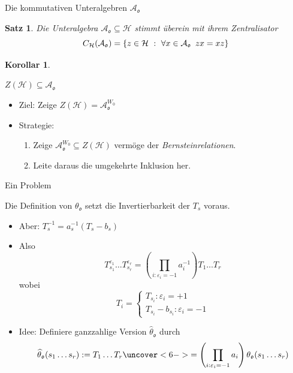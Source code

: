 \documentclass[pdf]{beamer}
\newtheorem*{satz*}{Satz}
\newtheorem*{cor*}{Korollar}
\begin{document}
\begin{frame}{Die kommutativen Unteralgebren $\mathcal{A}_{\mathfrak{o}}$}
   \begin{satz*}
      Die Unteralgebra $\mathcal{A}_{\mathfrak{o}} \subseteq \mathcal{H}$ stimmt überein mit ihrem Zentralisator
      \[ C_{\mathcal{H}}(\mathcal{A}_{\mathfrak{o}}) = \{ z \in \mathcal{H}\ :\ \forall x \in \mathcal{A}_{\mathfrak{o}}\enskip zx = xz\} \]
   \end{satz*}
   \pause \begin{cor*}
      \begin{center}$Z(\mathcal{H}) \subseteq \mathcal{A}_{\mathfrak{o}}$\end{center}
   \end{cor*}
   \pause\begin{itemize}
      \item Ziel: Zeige $Z(\mathcal{H}) = \mathcal{A}_{\mathfrak{o}}^{W_0}$
      \item<4-> Strategie:
         \begin{enumerate}
            \item<5-> Zeige $\mathcal{A}_{\mathfrak{o}}^{W_0} \subseteq Z(\mathcal{H})$ vermöge der \textit{Bernsteinrelationen}.
            \item<6-> Leite daraus die umgekehrte Inklusion her.
         \end{enumerate}
   \end{itemize}
\end{frame}

\begin{frame}{Ein Problem}
   \begin{problem}Die Definition von $\theta_\mathfrak{o}$ setzt die Invertierbarkeit der $T_s$ voraus.
   \end{problem}
   \begin{itemize}
      \item<2-> Aber: $T_s^{-1} = a_s^{-1}(T_s - b_s)$
      \item<3-> Also
         \[ T_{s_1}^{\varepsilon_1} \dots T_{s_r}^{\varepsilon_r} = \left(\prod_{i : \varepsilon_i = -1} a_i^{-1}\right) T_1 \dots T_r \]
         \pause[4]wobei
         \[ T_i = \begin{cases} T_{s_i} : \varepsilon_i = +1 \\ T_{s_i} - b_{s_i} : \varepsilon_i = -1
         \end{cases} \]
      \item<5-> Idee: Definiere ganzzahlige Version $\widehat{\theta}_\mathfrak{o}$ durch
         \[ \widehat{\theta}_\mathfrak{o}(s_1 \dots s_r) := T_1 \dots T_r \uncover<6->{= \left(\prod_{i : \varepsilon_i = -1} a_i\right)\theta_\mathfrak{o}(s_1 \dots s_r)} \]
   \end{itemize}
\end{frame}
\end{document}
